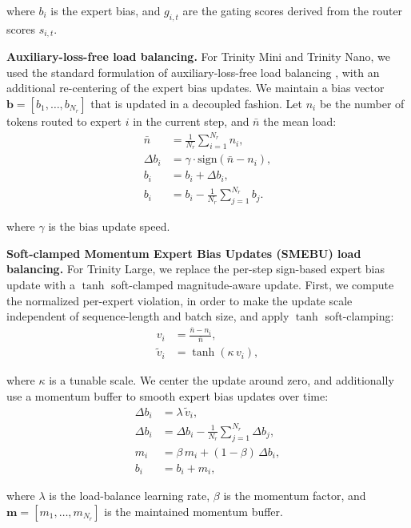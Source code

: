 \documentclass{article}
\begin{document}
where $b_i$ is the expert bias, and $g_{i,t}$ are the gating scores derived from the router scores $s_{i,t}$.

\noindent\textbf{Auxiliary-loss-free load balancing.}
For Trinity Mini and Trinity Nano, we used the standard formulation of auxiliary-loss-free load balancing \citep{wang2024auxiliarylossfreeloadbalancingstrategy}, with an additional re-centering of the expert bias updates.
We maintain a bias vector $\mathbf{b}=[b_1,\dots,b_{N_r}]$ that is updated in a decoupled fashion.
Let $n_i$ be the number of tokens routed to expert $i$ in the current step, and $\bar{n}$ the mean load:
\begin{align}
\bar{n}
&=
\frac{1}{N_r}\sum_{i=1}^{N_r} n_i,
\tag{19}\\
\Delta b_i
&=
\gamma \cdot \mathrm{sign}\!\left(\bar{n}-n_i\right),
\tag{20}\\
b_i
&=
b_i + \Delta b_i,
\tag{21}\\
b_i
&=
b_i - \frac{1}{N_r}\sum_{j=1}^{N_r} b_j.
\tag{22}
\end{align}

where $\gamma$ is the bias update speed.

\noindent\textbf{Soft-clamped Momentum Expert Bias Updates (SMEBU) load balancing.}
For Trinity Large, we replace the per-step sign-based expert bias update with a $\tanh$ soft-clamped magnitude-aware update.
First, we compute the normalized per-expert violation, in order to make the update scale independent of sequence-length and batch size, and apply $\tanh$ soft-clamping:
\begin{align}
v_i
&=
\frac{\bar{n}-n_i}{\bar{n}},
\tag{23}\\
\tilde{v}_i
&=
\tanh\!\left(\kappa\,v_i\right),
\tag{24}
\end{align}

where $\kappa$ is a tunable scale.
We center the update around zero, and additionally use a momentum buffer to smooth expert bias updates over time:
\begin{align}
\Delta b_i
&=
\lambda\,\tilde{v}_i,
\tag{25}\\
\Delta b_i
&=
\Delta b_i - \frac{1}{N_r}\sum_{j=1}^{N_r}\Delta b_j,
\tag{26}\\
m_i
&=
\beta\,m_i + (1-\beta)\,\Delta b_i,
\tag{27}\\
b_i
&=
b_i + m_i,
\tag{28}
\end{align}

where $\lambda$ is the load-balance learning rate, $\beta$ is the momentum factor, and $\mathbf{m}=[m_1,\dots,m_{N_r}]$ is the maintained momentum buffer.
\end{document}
